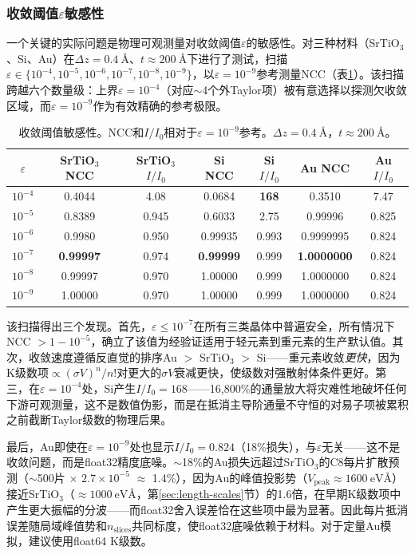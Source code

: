 \documentclass[twoside,11pt]{ctexart}
\begin{document}
\subsubsection{收敛阈值$\varepsilon$敏感性}\label{sec:epsilon}

一个关键的实际问题是物理可观测量对收敛阈值$\varepsilon$的敏感性。对三种材料（SrTiO$_3$、Si、Au）在$\Delta z=\SI{0.4}{\angstrom}$、$t\approx\SI{200}{\angstrom}$下进行了测试，扫描$\varepsilon\in\{10^{-4},10^{-5},10^{-6},10^{-7},10^{-8},10^{-9}\}$，以$\varepsilon=10^{-9}$参考测量NCC（表\ref{tab:epsilon}）。该扫描跨越六个数量级：上界$\varepsilon=10^{-4}$（对应$\sim$4个外Taylor项）被有意选择以探测欠收敛区域，而$\varepsilon=10^{-9}$作为有效精确的参考极限。

\begin{table}[H]
\centering
\caption{收敛阈值敏感性。NCC和$I/I_0$相对于$\varepsilon=10^{-9}$参考。$\Delta z=\SI{0.4}{\angstrom}$，$t\approx\SI{200}{\angstrom}$。}\label{tab:epsilon}
\small
\begin{tabular}{ccccccc}
\toprule
$\varepsilon$ & SrTiO$_3$ NCC & SrTiO$_3$ $I/I_0$ & Si NCC & Si $I/I_0$ & Au NCC & Au $I/I_0$ \\
\midrule
$10^{-4}$ & 0.4044 & 4.08 & 0.0684 & \textbf{168} & 0.3510 & 7.47 \\
$10^{-5}$ & 0.8389 & 0.945 & 0.6033 & 2.75 & 0.99996 & 0.825 \\
$10^{-6}$ & 0.9980 & 0.950 & 0.99935 & 0.993 & 0.9999995 & 0.824 \\
$10^{-7}$ & \textbf{0.99997} & 0.974 & \textbf{0.99999} & 0.999 & \textbf{1.0000000} & 0.824 \\
$10^{-8}$ & 0.99997 & 0.970 & 1.00000 & 0.999 & 1.0000000 & 0.824 \\
$10^{-9}$ & 1.00000 & 0.970 & 1.00000 & 0.999 & 1.0000000 & 0.824 \\
\bottomrule
\end{tabular}
\end{table}

该扫描得出三个发现。首先，$\varepsilon\le10^{-7}$在所有三类晶体中普遍安全，所有情况下NCC $>1-10^{-5}$，确立了该值为经验证适用于轻元素到重元素的生产默认值。其次，收敛速度遵循反直觉的排序Au $>$ SrTiO$_3$ $>$ Si——重元素收敛\textit{更快}，因为K级数项$\propto(\sigma V)^n/n!$对更大的$\sigma V$衰减更快，使级数对强散射体条件更好。第三，在$\varepsilon=10^{-4}$处，Si产生$I/I_0=168$——16,800\%的通量放大将灾难性地破坏任何下游可观测量，这不是数值伪影，而是在抵消主导阶通量不守恒的对易子项被累积之前截断Taylor级数的物理后果。

最后，Au即使在$\varepsilon=10^{-9}$处也显示$I/I_0=0.824$（18\%损失），与$\varepsilon$无关——这不是收敛问题，而是float32精度底噪。$\sim$18\%的Au损失远超过SrTiO$_3$的C8每片扩散预测（$\sim$500片 $\times$ $2.7\times10^{-5}$ $\approx$ 1.4\%），因为Au的峰值投影势（$V_\text{peak}\approx\SI{1600}{\electronvolt\angstrom}$）接近SrTiO$_3$（$\approx\SI{1000}{\electronvolt\angstrom}$，第\ref{sec:length-scales}节）的1.6倍，在早期K级数项中产生更大振幅的分波——而float32舍入误差恰在这些项中最为显著。因此每片抵消误差随局域峰值势和$n_\text{slices}$共同标度，使float32底噪依赖于材料。对于定量Au模拟，建议使用float64 K级数。
\end{document}
